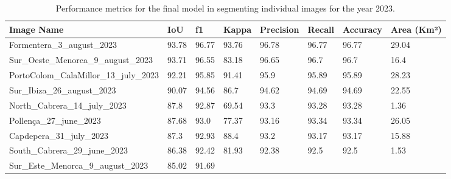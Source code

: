 \begin{table}[H]
    \centering
    \caption{Performance metrics for the final model in segmenting
        individual images for the year 2023.}
    \label{tab:metrics_img_final_2023}
    \begin{tabular}{llllllll}
        \toprule
        Image Name                             & IoU       & f1         &
        Kappa                                  & Precision &
        Recall                                 & Accuracy  & Area (Km²)
        \\ \midrule
        Formentera\_3\_august\_2023            & 93.78     & 96.77      &
        93.76                                  & 96.78     &
        96.77                                  & 96.77     & 29.04
        \\
        Sur\_Oeste\_Menorca\_9\_august\_2023   & 93.71     & 96.55      &
        83.18                                  & 96.65     &
        96.7                                   & 96.7      & 16.4
        \\
        PortoColom\_CalaMillor\_13\_july\_2023 & 92.21     & 95.85      &
        91.41                                  & 95.9      &
        95.89                                  & 95.89     & 28.23
        \\
        Sur\_Ibiza\_26\_august\_2023           & 90.07     & 94.56      &
        86.7                                   & 94.62     &
        94.69                                  & 94.69     & 22.55
        \\
        North\_Cabrera\_14\_july\_2023         & 87.8      & 92.87      &
        69.54                                  & 93.3      &
        93.28                                  & 93.28     & 1.36
        \\
        Pollença\_27\_june\_2023               & 87.68     & 93.0       &
        77.37                                  & 93.16     &
        93.34                                  & 93.34     & 26.05
        \\
        Capdepera\_31\_july\_2023              & 87.3      & 92.93      &
        88.4                                   & 93.2      &
        93.17                                  & 93.17     & 15.88
        \\
        South\_Cabrera\_29\_june\_2023         & 86.38     & 92.42      &
        81.93                                  & 92.38     &
        92.5                                   & 92.5      & 1.53
        \\
        Sur\_Este\_Menorca\_9\_august\_2023    & 85.02     & 91.69      &

\end{tabular}
\end{table}
